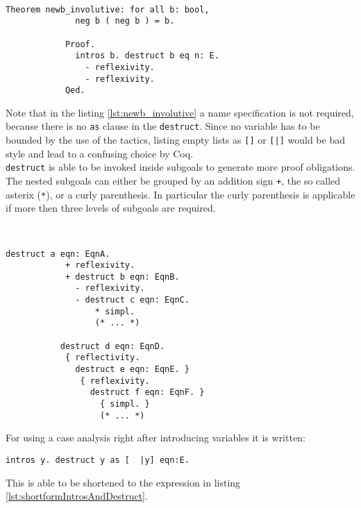 		\begin{example} ~\\\vspace{-10mm}
		  \begin{lstlisting}[caption=\lstinline!newb_invloutive!, label=lst:newb_involutive]
		  	Theorem newb_involutive: for all b: bool,
		  	  neg b ( neg b ) = b.
		  	  
		  	Proof. 
		  	  intros b. destruct b eq n: E.
		  	    - reflexivity. 
		  	    - reflexivity. 
		  	Qed.  	   
		  \end{lstlisting}
		\end{example}	 
		 Note that in the listing \ref{lst:newb_involutive} a name specification is not required, because there is no \lstinline!as! clause in the \lstinline!destruct!.
		 Since no variable has to be bounded by the use of the tactics, listing empty lists as \lstinline![]! or \lstinline![|]! would be bad style and lead to a confusing choice by Coq.\\	 
		 \lstinline!destruct! is able to be invoked inside subgoals to generate more proof obligations.
		  The nested subgoals can either be grouped by an addition sign \lstinline!+!, the so called asterix (\lstinline!*!), or a curly parenthesis. 
		  In particular the curly parenthesis is applicable if more then three levels of subgoals are required. 
		  \begin{example} 
		  ~\\\vspace{-10mm}
		  \begin{lstlisting}[caption = syntax of nested \lstinline!destruct! expressions]
		  destruct a eqn: EqnA.
		    + reflexivity.
		    + destruct b eqn: EqnB.
		      - reflexivity.
		      - destruct c eqn: EqnC.
		          * simpl. 
		          (* ... *)       
		  
		   destruct d eqn: EqnD.
		    { reflectivity.
		      destruct e eqn: EqnE. } 
		       { reflexivity.
		         destruct f eqn: EqnF. } 
		           { simpl. }
		           (* ... *)   
		   \end{lstlisting}
		   \end{example}	 
		  For using a case analysis right after introducing variables it is written:
		  \begin{lstlisting}[caption = \lstinline!intros! and \lstinline!destruct!]
		  	intros y. destruct y as [  |y] eqn:E.
		  \end{lstlisting}	
		  This is able to be shortened to the expression in listing \ref{lst:shortformIntrosAndDestruct}.  
